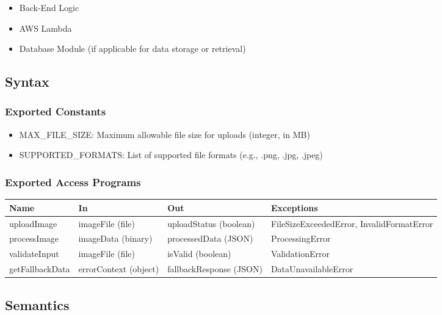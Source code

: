 \documentclass[12pt, titlepage]{article}
\begin{document}
\begin{itemize}
  \item Back-End Logic
  \item AWS Lambda
  \item Database Module (if applicable for data storage or retrieval)
\end{itemize}

\subsection{Syntax}

\subsubsection{Exported Constants}

\begin{itemize}
  \item MAX\_FILE\_SIZE: Maximum allowable file size for uploads (integer, in MB)
  \item SUPPORTED\_FORMATS: List of supported file formats (e.g., .png, .jpg, .jpeg)
\end{itemize}

\subsubsection{Exported Access Programs}

\begin{center}
\begin{tabular}{p{2cm} p{4cm} p{4cm} p{2cm}}
\hline
\textbf{Name} & \textbf{In} & \textbf{Out} & \textbf{Exceptions} \\
\hline
uploadImage & imageFile (file) & uploadStatus (boolean) & FileSizeExceededError, InvalidFormatError \\
\hline
processImage & imageData (binary) & processedData (JSON) & ProcessingError \\
\hline
validateInput & imageFile (file) & isValid (boolean) & ValidationError \\
\hline
getFallbackData & errorContext (object) & fallbackResponse (JSON) & DataUnavailableError \\
\hline
\end{tabular}
\end{center}

\subsection{Semantics}
\end{document}
